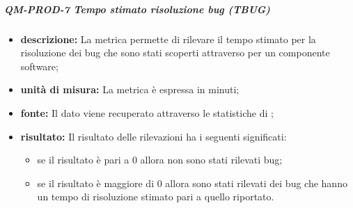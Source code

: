 			\subparagraph{ QM-PROD-7 Tempo stimato risoluzione bug (TBUG)}
			\begin{itemize}
      			\item \textbf{descrizione: }
					La metrica permette di rilevare il tempo stimato per la risoluzione dei bug che sono stati scoperti attraverso  per un componente software;
				\item \textbf{unità di misura: }
					La metrica è espressa in minuti;
				\item \textbf{fonte: }
					Il dato viene recuperato attraverso le statistiche di ;
				\item \textbf{risultato: }
					Il risultato delle rilevazioni ha i seguenti significati:
					\begin{itemize}
						\item se il risultato è pari a 0 allora non sono stati rilevati bug;
						\item se il risultato è maggiore di 0 allora sono stati rilevati dei bug che hanno un tempo di risoluzione stimato pari a quello riportato.
					\end{itemize}
			\end{itemize}



